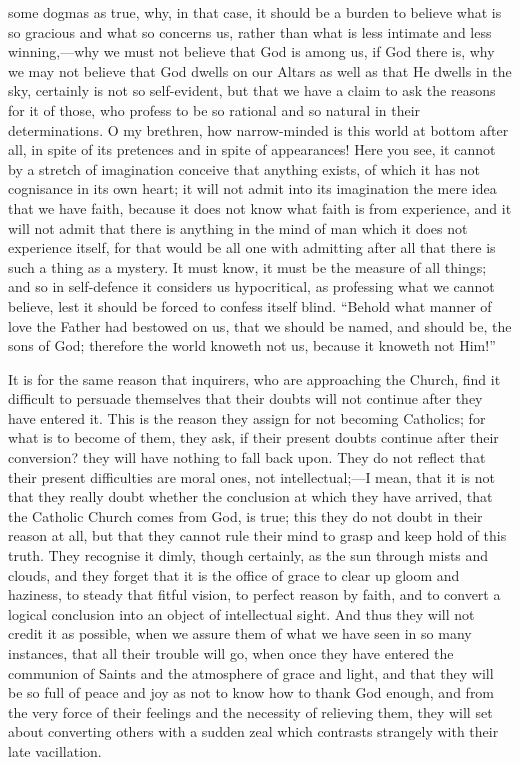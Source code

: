 some dogmas as true, why, in that case, it should be a burden to
believe what is so gracious and what so concerns us, rather than what
is less intimate and less winning,—why we must not believe that God
is among us, if God there is, why we may not believe that God dwells
on our Altars as well as that He dwells in the sky, certainly is not
so self-evident, but that we have a claim to ask the reasons for it of
those, who profess to be so rational and so natural in their
determinations. O my brethren, how narrow-minded is this world at
bottom after all, in spite of its pretences and in spite of
appearances! Here you see, it cannot by a stretch of imagination
conceive that anything exists, of which it has not cognisance in its
own heart; it will not admit into its imagination the mere idea that
we have faith, because it does not know what faith is from experience,
and it will not admit that there is anything in the mind of man which
it does not experience itself, for that would be all one with
admitting after all that there is such a thing as a mystery. It must
know, it must be the measure of all things; and so in self-defence it
considers us hypocritical, as professing what we cannot believe, lest
it should be forced to confess itself blind. ``Behold what manner
of love the Father had bestowed on us, that we should be named, and
should be, the sons of God; therefore the world knoweth not us,
because it knoweth not Him!''

It is for the same reason that inquirers, who are approaching the
Church, find it difficult to persuade themselves that their doubts
will not continue after they have entered it. This is the reason they
assign for not becoming Catholics; for what is to become of them, they
ask, if their present doubts continue after their conversion? they
will have nothing to fall back upon. They do not reflect that their
present difficulties are moral ones, not intellectual;—I mean, that
it is not that they really doubt whether the conclusion at which they
have arrived, that the Catholic Church comes from God, is true; this
they do not doubt in their reason at all, but that they cannot rule
their mind to grasp and keep hold of this truth. They recognise it
dimly, though certainly, as the sun through mists and clouds, and they
forget that it is the office of grace to clear up gloom and haziness,
to steady that fitful vision, to perfect reason by faith, and to
convert a logical conclusion into an object of intellectual sight. And
thus they will not credit it as possible, when we assure them of what
we have seen in so many instances, that all their trouble will go,
when once they have entered the communion of Saints and the atmosphere
of grace and light, and that they will be so full of peace and joy as
not to know how to thank God enough, and from the very force of their
feelings and the necessity of relieving them, they will set about
converting others with a sudden zeal which contrasts strangely with
their late vacillation.

